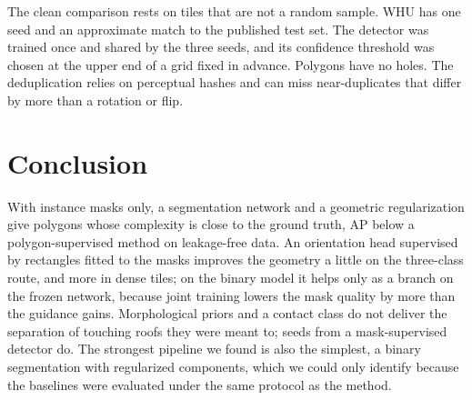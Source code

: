 \documentclass[conference]{IEEEtran}
\begin{document}
The clean comparison rests on \NTilesClean{} tiles that are not a random sample. WHU has one seed and an approximate
match to the published test set. The detector was trained once and shared by the three seeds, and its confidence
threshold was chosen at the upper end of a grid fixed in advance. Polygons have no holes. The deduplication relies on
perceptual hashes and can miss near-duplicates that differ by more than a rotation or flip.

\section{Conclusion}
With instance masks only, a segmentation network and a geometric regularization give polygons whose complexity is close
to the ground truth, \NCleanDeltaApAbs{} AP below a polygon-supervised method on leakage-free data. An orientation head
supervised by rectangles fitted to the masks improves the geometry a little on the three-class route, and more in
dense tiles; on the binary model it helps only as a branch on the frozen network, because joint training lowers the
mask quality by more than the guidance gains. Morphological
priors and a contact class do not deliver the separation of touching roofs they were meant to; seeds from a
mask-supervised detector do. The strongest pipeline we found is also the simplest, a binary segmentation with
regularized components, which we could only identify because the baselines were evaluated under the same protocol as
the method.



\end{document}
